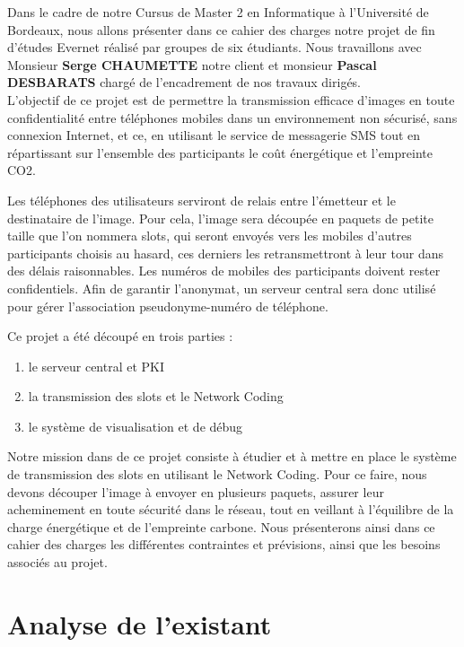 \documentclass[a4paper, 12pt]{article}
\begin{document}
Dans le cadre de notre Cursus de Master 2 en Informatique à l'Université de Bordeaux, nous allons présenter dans ce cahier des charges notre projet de fin d'études Evernet réalisé par groupes de six étudiants. Nous travaillons avec Monsieur \textbf{Serge CHAUMETTE} notre client et monsieur \textbf{Pascal DESBARATS} chargé de l'encadrement de nos travaux dirigés.\\

L'objectif de ce projet est de permettre la transmission efficace d'images en toute confidentialité entre téléphones mobiles dans un environnement non sécurisé, sans connexion Internet, et ce, en utilisant le service de messagerie SMS tout en répartissant sur l'ensemble des participants le coût énergétique et l'empreinte CO2. 

Les téléphones des utilisateurs serviront de relais entre l'émetteur et le destinataire de l'image. Pour cela, l'image sera découpée en paquets de petite taille que l'on nommera slots, qui seront envoyés vers les mobiles d'autres participants choisis au hasard, ces derniers les retransmettront à leur tour dans des délais raisonnables.
Les numéros de mobiles des participants doivent rester confidentiels. Afin de garantir l'anonymat, un serveur central sera donc utilisé pour gérer l'association pseudonyme-numéro de téléphone.

Ce projet a été découpé en trois parties : 
\begin{enumerate} 
    \item le serveur central et PKI
    \item la transmission des slots et le Network Coding
    \item le système de visualisation et de débug
\end{enumerate}

Notre mission dans de ce projet consiste à étudier et à mettre en place le système de transmission des slots en utilisant le Network Coding. Pour ce faire, nous devons découper l'image à envoyer en plusieurs paquets, assurer leur acheminement en toute sécurité dans le réseau, tout en veillant à l'équilibre de la charge énergétique et de l'empreinte carbone.
Nous présenterons ainsi dans ce cahier des charges les différentes contraintes et prévisions, ainsi que les besoins associés au projet. 


\section{Analyse de l'existant}
\end{document}
